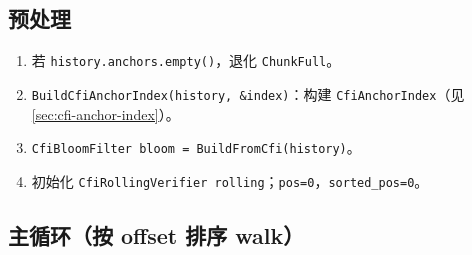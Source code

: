 \subsection{预处理}

\begin{enumerate}[label=\textbf{I-\arabic*.}]
  \item 若 \texttt{history.anchors.empty()}，退化 \texttt{ChunkFull}。
  \item \texttt{BuildCfiAnchorIndex(history, \&index)}：构建 \texttt{CfiAnchorIndex}（见 \cref{sec:cfi-anchor-index}）。
  \item \texttt{CfiBloomFilter bloom = BuildFromCfi(history)}。
  \item 初始化 \texttt{CfiRollingVerifier rolling}；\texttt{pos=0}，\texttt{sorted\_pos=0}。
\end{enumerate}

\subsection{主循环（按 offset 排序 walk）}

